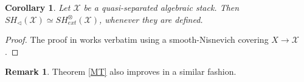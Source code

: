 \documentclass[10pt]{amsart}
\theoremstyle{plain}
\newtheorem{theorem}[thm]{Theorem}
\newtheorem{corollary}[thm]{Corollary}
\theoremstyle{definition}
\newtheorem{remark}[thm]{Remark}
\newcommand{\sU}{{\mathcal U}}
\newcommand{\sX}{{\mathcal X}}
\newcommand{\holim}{{\rm holim \,}}
\begin{document}
\begin{corollary}
	Let $\sX$ be a quasi-separated algebraic stack. Then $SH_\lhd (\sX)\simeq SH_{ext}^{\otimes}(\sX)$, whenever they are defined.
\end{corollary}
\begin{proof}
	The proof in \cite[Corollary 2.5.4]{chow21} works verbatim using a smooth-Nisnevich covering $X\rightarrow \sX$.
\end{proof}


\begin{remark}
	Theorem \ref{MT} also improves \cite[Corollary 12.28]{khan2021generalized} in a similar fashion.
\end{remark}



\appendix

\end{document}
